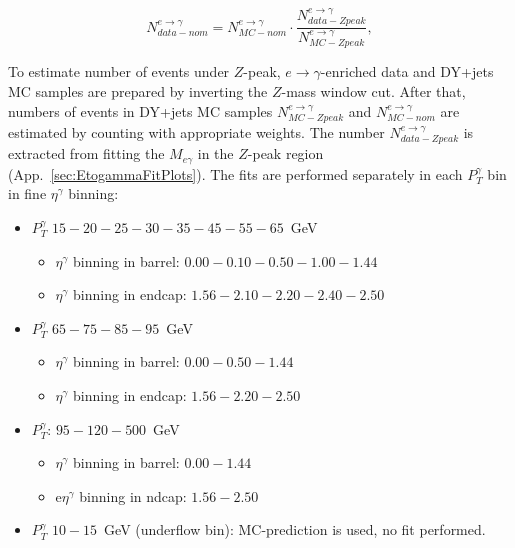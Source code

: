 \begin{equation}
N_{data-nom}^{e\rightarrow\gamma} = N_{MC-nom}^{e\rightarrow\gamma} \cdot \frac{N_{data-Zpeak}^{e\rightarrow\gamma}}{N_{MC-Zpeak}^{e\rightarrow\gamma}}, 
\end{equation}

To estimate number of events under $Z$-peak, $e\rightarrow\gamma$-enriched data and DY+jets MC samples are prepared by inverting the $Z$-mass
window cut. After that, numbers of events in DY+jets MC samples $N_{MC-Zpeak}^{e\rightarrow\gamma}$ and $N_{MC-nom}^{e\rightarrow\gamma}$ are estimated by counting with appropriate weights. The number $N_{data-Zpeak}^{e\rightarrow\gamma}$ is extracted from fitting the $M_{e\gamma}$ in the $Z$-peak region (App.~\ref{sec:EtogammaFitPlots}). The fits are performed separately in each $P_T^\gamma$ bin in fine $\eta^\gamma$ binning:
     \begin{itemize}
        \item $P_T^\gamma$ $15-20-25-30-35-45-55-65$~GeV
           \begin{itemize}
              \item $\eta^\gamma$ binning in barrel: $0.00-0.10-0.50-1.00-1.44$
              \item $\eta^\gamma$ binning in endcap: $1.56-2.10-2.20-2.40-2.50$
           \end{itemize}
        \item $P_T^\gamma$ $65-75-85-95$~GeV
          \begin{itemize}
              \item $\eta^\gamma$ binning in barrel: $0.00-0.50-1.44$
              \item $\eta^\gamma$ binning in endcap: $1.56-2.20-2.50$
           \end{itemize}
        \item $P_T^\gamma$: $95-120-500$~GeV
          \begin{itemize}
              \item $\eta^\gamma$ binning in barrel: $0.00-1.44$
              \item e$\eta^\gamma$ binning in ndcap: $1.56-2.50$
           \end{itemize}
        \item $P_T^\gamma$ $10-15$~GeV (underflow bin): MC-prediction is used, no fit performed.
     \end{itemize}

